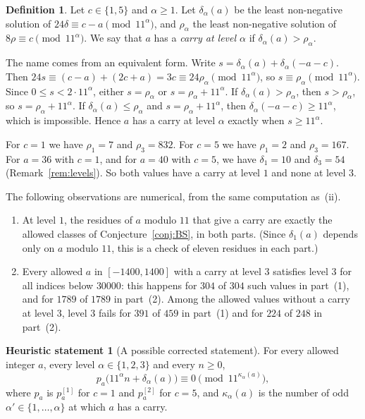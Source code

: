 \documentclass[11pt]{amsart}
\theoremstyle{definition}
\newtheorem{definition}[theorem]{Definition}
\newtheorem{heuristic}[theorem]{Heuristic statement}
\theoremstyle{remark}
\newcommand{\pone}[1]{p^{[1]}_{#1}}
\newcommand{\ptwo}[1]{p^{[2]}_{#1}}
\begin{document}
\begin{definition}\label{def:carry}
Let \(c\in\{1,5\}\) and \(\alpha\ge1\). Let \(\delta_\alpha(a)\) be the least non-negative solution of \(24\delta\equiv c-a\pmod{11^\alpha}\), and \(\rho_\alpha\) the least non-negative solution of \(8\rho\equiv c\pmod{11^\alpha}\). We say that \(a\) has a \emph{carry at level \(\alpha\)} if \(\delta_\alpha(a)>\rho_\alpha\).
\end{definition}

The name comes from an equivalent form. Write \(s=\delta_\alpha(a)+\delta_\alpha(-a-c)\). Then \(24s\equiv(c-a)+(2c+a)=3c\equiv24\rho_\alpha\pmod{11^\alpha}\), so \(s\equiv\rho_\alpha\pmod{11^\alpha}\). Since \(0\le s<2\cdot11^\alpha\), either \(s=\rho_\alpha\) or \(s=\rho_\alpha+11^\alpha\). If \(\delta_\alpha(a)>\rho_\alpha\), then \(s>\rho_\alpha\), so \(s=\rho_\alpha+11^\alpha\). If \(\delta_\alpha(a)\le\rho_\alpha\) and \(s=\rho_\alpha+11^\alpha\), then \(\delta_\alpha(-a-c)\ge11^\alpha\), which is impossible. Hence \(a\) has a carry at level \(\alpha\) exactly when \(s\ge11^\alpha\).

For \(c=1\) we have \(\rho_1=7\) and \(\rho_3=832\). For \(c=5\) we have \(\rho_1=2\) and \(\rho_3=167\). For \(a=36\) with \(c=1\), and for \(a=40\) with \(c=5\), we have \(\delta_1=10\) and \(\delta_3=54\) (Remark~\ref{rem:levels}). So both values have a carry at level \(1\) and none at level \(3\).

The following observations are numerical, from the same computation as~(ii).
\begin{enumerate}
\item[(iii)] At level \(1\), the residues of \(a\) modulo \(11\) that give a carry are exactly the allowed classes of Conjecture~\ref{conj:BS}, in both parts. (Since \(\delta_1(a)\) depends only on \(a\) modulo \(11\), this is a check of eleven residues in each part.)
\item[(iv)] Every allowed \(a\) in \([-1400,1400]\) with a carry at level \(3\) satisfies level \(3\) for all indices below \(30000\): this happens for \(304\) of \(304\) such values in part~(1), and for \(1789\) of \(1789\) in part~(2). Among the allowed values without a carry at level \(3\), level \(3\) fails for \(391\) of \(459\) in part~(1) and for \(224\) of \(248\) in part~(2).
\end{enumerate}

\begin{heuristic}[A possible corrected statement]\label{heur:carry}
For every allowed integer \(a\), every level \(\alpha\in\{1,2,3\}\) and every \(n\ge0\),
\[
p_a\bigl(11^\alpha n+\delta_\alpha(a)\bigr)\equiv0\pmod{11^{\kappa_\alpha(a)}},
\]
where \(p_a\) is \(\pone{a}\) for \(c=1\) and \(\ptwo{a}\) for \(c=5\), and \(\kappa_\alpha(a)\) is the number of odd \(\alpha'\in\{1,\dots,\alpha\}\) at which \(a\) has a carry.
\end{heuristic}
\end{document}
